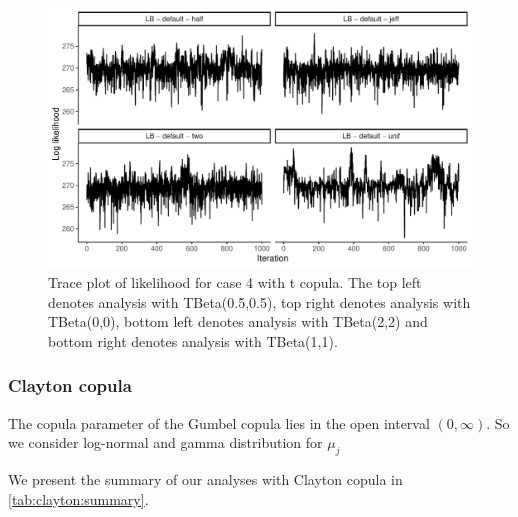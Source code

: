 \documentclass{amsart}
\begin{document}
\begin{figure}
	\centering
	\includegraphics[width = 0.75\linewidth]{trace_case4_t_like.pdf}
	\caption{Trace plot of likelihood for case 4 with t copula. The top left denotes analysis with TBeta(0.5,0.5), top right denotes analysis with TBeta(0,0), bottom left denotes analysis with TBeta(2,2) and bottom right denotes analysis with TBeta(1,1).}
	\label{fig:case4:t:like}
\end{figure}

\subsubsection{Clayton copula} The copula parameter of the Gumbel copula lies in the open interval $(0,\infty)$. So we consider log-normal and gamma distribution for $\mu_j$

We present the summary of our analyses with Clayton copula in \cref{tab:clayton:summary}. 
\end{document}
